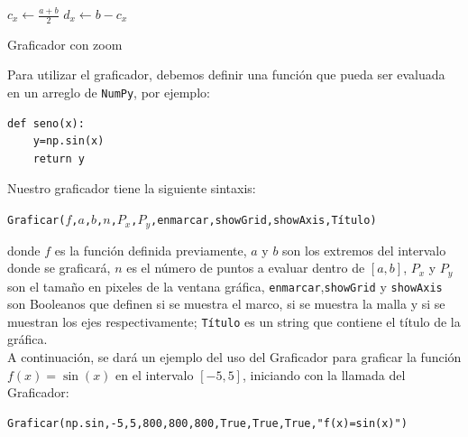 \documentclass[10pt]{article}
\begin{document}
\begin{algorithm}[htbp]
	\SetAlgoLined
	\KwOut{}
	$c_x\gets \frac{a+b}{2}$\;
	$d_x\gets b-c_x$\;
  \caption{Graficador con zoom}\label{alg:GraficadorZoom}
\end{algorithm}
Para utilizar el graficador, debemos definir una función que pueda ser evaluada en un arreglo de \texttt{NumPy}, por ejemplo:



\begin{verbatim}
def seno(x):
	y=np.sin(x)
	return y
\end{verbatim}

\noindent Nuestro graficador tiene la siguiente sintaxis:
\begin{center}
\texttt{Graficar($f$,$a$,$b$,$n$,$P_x$,$P_y$,enmarcar,showGrid,showAxis,Título)}
\end{center}
donde $f$ es la función definida previamente, $a$ y $b$ son los extremos del intervalo donde se graficará, $n$ es el número de puntos a evaluar dentro de $[a,b]$, $P_x$ y $P_y$ son el tamaño en pixeles de la ventana gráfica, \texttt{enmarcar},\texttt{showGrid} y \texttt{showAxis} son Booleanos que definen si se muestra el marco, si se muestra la malla y si se muestran los ejes respectivamente; \texttt{Título} es un string que contiene el título de la gráfica.\\
A continuación, se dará un ejemplo del uso del Graficador para graficar la función $f(x)=\sin(x)$ en el intervalo $[-5,5]$, iniciando con la llamada del Graficador:

\begin{verbatim}
Graficar(np.sin,-5,5,800,800,800,True,True,True,"f(x)=sin(x)")
\end{verbatim}
\end{document}
